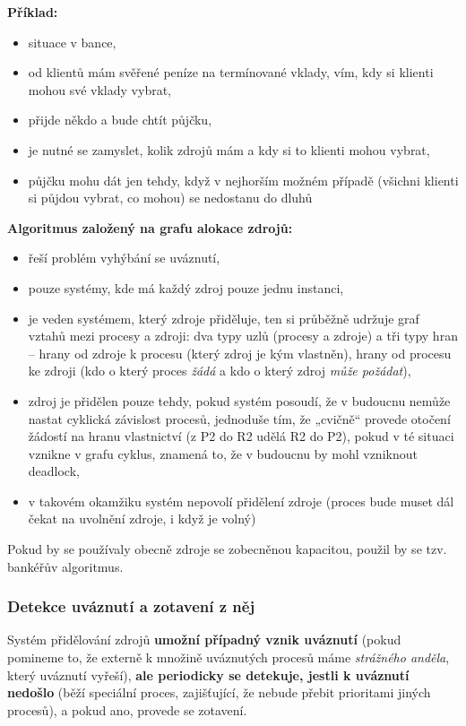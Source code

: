 \documentclass[a4paper, 11pt]{article}
\begin{document}
\textbf{Příklad:}
\begin{itemize}
    \item situace v bance,
    \item od klientů mám svěřené peníze na termínované vklady, vím, kdy si klienti mohou své vklady vybrat,
    \item přijde někdo a bude chtít půjčku,
    \item je nutné se zamyslet, kolik zdrojů mám a kdy si to klienti mohou vybrat,
    \item půjčku mohu dát jen tehdy, když v nejhorším možném případě (všichni klienti si půjdou vybrat, co mohou) se nedostanu do dluhů
\end{itemize}

\textbf{Algoritmus založený na grafu alokace zdrojů:}
\begin{itemize}
    \item řeší problém vyhýbání se uváznutí,
    \item pouze systémy, kde má každý zdroj pouze jednu instanci,
    \item je veden systémem, který zdroje přiděluje, ten si průběžně udržuje graf vztahů mezi procesy a zdroji: dva typy uzlů (procesy a zdroje) a tři typy hran -- hrany od zdroje k procesu (který zdroj je kým vlastněn), hrany od procesu ke zdroji (kdo o který proces \emph{žádá} a kdo o který zdroj \emph{může požádat}),
    \item zdroj je přidělen pouze tehdy, pokud systém posoudí, že v budoucnu nemůže nastat cyklická závislost procesů, jednoduše tím, že „cvičně“ provede otočení žádostí na hranu vlastnictví (z P2 do R2 udělá R2 do P2), pokud v té situaci vznikne v grafu cyklus, znamená to, že v budoucnu by mohl vzniknout deadlock,
    \item v takovém okamžiku systém nepovolí přidělení zdroje (proces bude muset dál čekat na uvolnění zdroje, i když je volný)
\end{itemize}
 
Pokud by se používaly obecně zdroje se zobecněnou kapacitou, použil by se tzv. bankéřův algoritmus.

\subsubsection{Detekce uváznutí a zotavení z něj}
Systém přidělování zdrojů \textbf{umožní případný vznik uváznutí} (pokud pomineme to, že externě k množině uváznutých procesů máme \textit{strážného anděla}, který uváznutí vyřeší), \textbf{ale periodicky se detekuje, jestli k uváznutí nedošlo} (běží speciální proces, zajišťující, že nebude přebit prioritami jiných procesů), a pokud ano, provede se zotavení.
 
\end{document}
